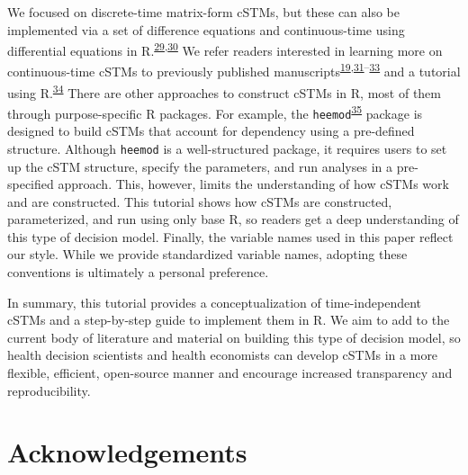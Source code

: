 \documentclass[
]{article}
\begin{document}
We focused on discrete-time matrix-form cSTMs, but these can also be implemented via a set of difference equations and continuous-time using differential equations in R.\textsuperscript{\protect\hyperlink{ref-Grimmett2014}{29},\protect\hyperlink{ref-Axler2005}{30}} We refer readers interested in learning more on continuous-time cSTMs to previously published manuscripts\textsuperscript{\protect\hyperlink{ref-VanRosmalen2013}{19},\protect\hyperlink{ref-Cao2016}{31}--\protect\hyperlink{ref-Soares2012}{33}} and a tutorial using R.\textsuperscript{\protect\hyperlink{ref-Frederix2013a}{34}} There are other approaches to construct cSTMs in R, most of them through purpose-specific R packages. For example, the \texttt{heemod}\textsuperscript{\protect\hyperlink{ref-Filipovic-Pierucci2017}{35}} package is designed to build cSTMs that account for dependency using a pre-defined structure. Although \texttt{heemod} is a well-structured package, it requires users to set up the cSTM structure, specify the parameters, and run analyses in a pre-specified approach. This, however, limits the understanding of how cSTMs work and are constructed. This tutorial shows how cSTMs are constructed, parameterized, and run using only base R, so readers get a deep understanding of this type of decision model. Finally, the variable names used in this paper reflect our style. While we provide standardized variable names, adopting these conventions is ultimately a personal preference.

In summary, this tutorial provides a conceptualization of time-independent cSTMs and a step-by-step guide to implement them in R. We aim to add to the current body of literature and material on building this type of decision model, so health decision scientists and health economists can develop cSTMs in a more flexible, efficient, open-source manner and encourage increased transparency and reproducibility.

\hypertarget{acknowledgements}{%
\section{Acknowledgements}\label{acknowledgements}}
\end{document}
